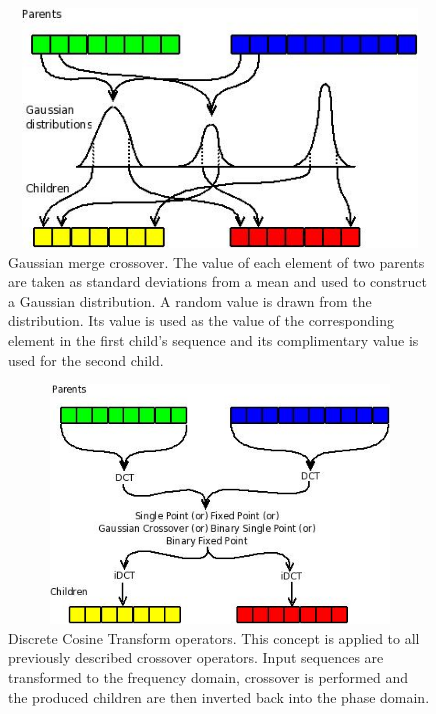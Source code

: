 \documentclass[12pt]{article}
\begin{document}
\begin{figure}[htb]
\begin{center}
\includegraphics[height=2.5in,width=4.5in]{images/gaussian_crossover.jpeg}
\caption{
    Gaussian merge crossover.  The value of each element of two parents are taken as standard deviations from a mean and used to construct a Gaussian distribution.  A random value is drawn from the distribution.  Its value is used as the value of the corresponding element in the first child's sequence and its complimentary value is used for the second child.
}
\end{center}
\end{figure}

\begin{figure}[htb]
\begin{center}
\includegraphics[height=2.5in,width=4.5in]{images/dct_crossover.jpeg}
\caption{
    Discrete Cosine Transform operators.  This concept is applied to all previously described crossover operators.  Input sequences are transformed to the frequency domain, crossover is performed and the produced children are then inverted back into the phase domain.
}
\end{center}
\end{figure}
\end{document}
